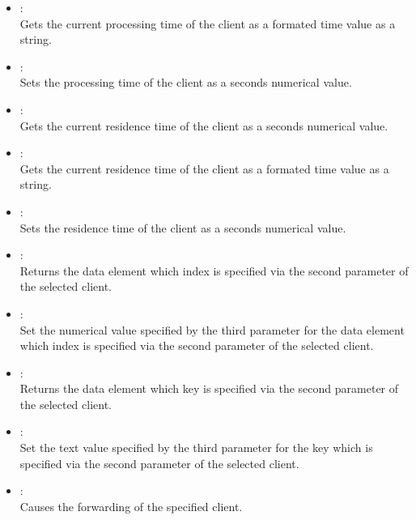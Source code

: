 \begin{itemize}
\item
{}:\\
Gets the current processing time of the client as a formated time value as a string.

\item
{}:\\
Sets the processing time of the client as a seconds numerical value.

\item
{}:\\
Gets the current residence time of the client as a seconds numerical value.

\item
{}:\\
Gets the current residence time of the client as a formated time value as a string.

\item
{}:\\
Sets the residence time of the client as a seconds numerical value.

\item
{}:\\
Returns the data element which index is specified via the second parameter of the selected client.

\item
{}:\\
Set the numerical value specified by the third parameter for the data element which index is specified via the second parameter of the selected client.

\item
{}:\\
Returns the data element which key is specified via the second parameter of the selected client.

\item
{}:\\
Set the text value specified by the third parameter for the key which is specified via the second parameter of the selected client.

\item
{}:\\
Causes the forwarding of the specified client.
	
\end{itemize}



